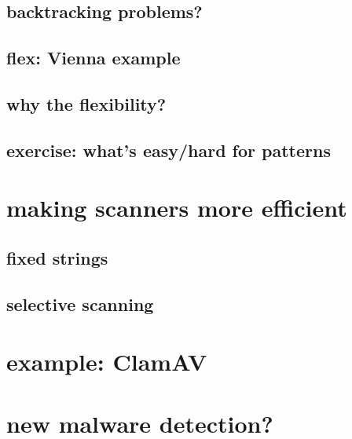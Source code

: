 \subsection{backtracking problems?}




\subsection{flex: Vienna example}


\subsection{why the flexibility?}

\subsection{exercise: what's easy/hard for patterns}


\section{making scanners more efficient}


\subsection{fixed strings}


\subsection{selective scanning}


\section{example: ClamAV}


\section{new malware detection?}


